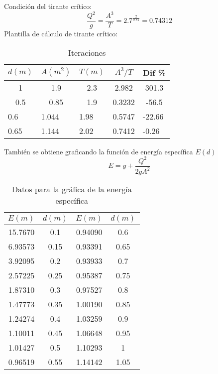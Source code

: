 Condición del tirante crítico:
\begin{equation*}
    \frac{Q^2}{g} = \frac{A^3}{T} = 2.7^\frac{2}{9.81} =0.74312
\end{equation*}
Plantilla de cálculo de tirante crítico:
\begin{table}[h!]
    \centering
    \begin{tabular}{@{}ccccc@{}}
    \toprule
    $d(m)$                   & $A(m^2)$                  & $T(m)$                   & $A^3/T$                    & Dif \%                     \\ \midrule
    1                        & 1.9                       & 2.3                      & 2.982                      & 301.3                      \\
    0.5                      & 0.85                      & 1.9                      & 0.3232                     & -56.5                      \\
    \multicolumn{1}{l}{0.6}  & \multicolumn{1}{l}{1.044} & \multicolumn{1}{l}{1.98} & \multicolumn{1}{l}{0.5747} & \multicolumn{1}{l}{-22.66} \\
    \multicolumn{1}{l}{0.65} & \multicolumn{1}{l}{1.144} & \multicolumn{1}{l}{2.02} & \multicolumn{1}{l}{0.7412} & \multicolumn{1}{l}{-0.26}  \\ \bottomrule
    \end{tabular}
    \caption{Iteraciones}
    \label{tabhb34}
\end{table}
También se obtiene graficando la función de energía específica $E(d)$
\begin{equation*}
    E = y + \frac{Q^2}{2gA^2}
\end{equation*}
\begin{table}[h!]
    \centering
    \begin{tabular}{@{}cccc@{}}
    \toprule
    $E(m)$  & $d(m)$ & $E(m)$  & $d(m)$ \\ \midrule
    15.7670 & 0.1    & 0.94090 & 0.6    \\
    6.93573 & 0.15   & 0.93391 & 0.65   \\
    3.92095 & 0.2    & 0.93933 & 0.7    \\
    2.57225 & 0.25   & 0.95387 & 0.75   \\
    1.87310 & 0.3    & 0.97527 & 0.8    \\
    1.47773 & 0.35   & 1.00190 & 0.85   \\
    1.24274 & 0.4    & 1.03259 & 0.9    \\
    1.10011 & 0.45   & 1.06648 & 0.95   \\
    1.01427 & 0.5    & 1.10293 & 1      \\
    0.96519 & 0.55   & 1.14142 & 1.05   \\ \bottomrule
    \end{tabular}
    \caption{Datos para la gráfica de la energía específica}
    \label{tabhb35}
    \end{table}
